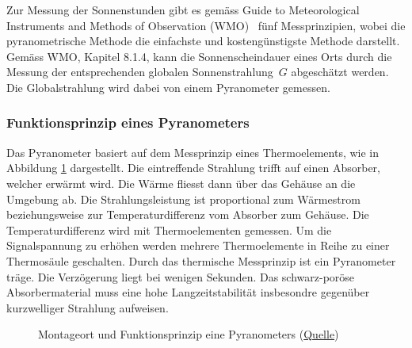 \noindent
Zur Messung der Sonnenstunden gibt es gemäss \flqq Guide to Meteorological Instruments and Methods of Observation (WMO)\frqq ~\cite{WMO2014Gtmi} fünf Messprinzipien, wobei die pyranometrische Methode die einfachste und kostengünstigste Methode darstellt. Gemäss WMO, Kapitel 8.1.4, kann die Sonnenscheindauer eines Orts durch die Messung der entsprechenden globalen Sonnenstrahlung\ $G$ abgeschätzt werden. Die Globalstrahlung wird dabei von einem Pyranometer gemessen.


\subsubsection{Funktionsprinzip eines Pyranometers}
Das Pyranometer basiert auf dem Messprinzip eines Thermoelements, wie in Abbildung \ref{img:pyranometer}  dargestellt. Die eintreffende Strahlung trifft auf einen Absorber, welcher erwärmt wird. Die Wärme fliesst dann über das Gehäuse an die Umgebung ab. Die Strahlungsleistung ist proportional zum Wärmestrom beziehungsweise zur Temperaturdifferenz vom Absorber zum Gehäuse. Die Temperaturdifferenz wird mit Thermoelementen gemessen. Um die Signalspannung zu erhöhen werden mehrere Thermoelemente in Reihe zu einer Thermosäule geschalten. Durch das thermische Messprinzip ist ein Pyranometer träge. Die Verzögerung liegt bei wenigen Sekunden. Das schwarz-poröse Absorbermaterial muss eine hohe Langzeitstabilität insbesondre gegenüber kurzwelliger Strahlung aufweisen.

\begin{figure}[htbp]
	\centering
	\caption{Montageort und Funktionsprinzip eine Pyranometers (\href{http://www.kippzonen.com/News/572/The-Working-Principle-of-a-Thermopile-Pyranometer}{Quelle})}
	\label{img:pyranometer}
\end{figure}



